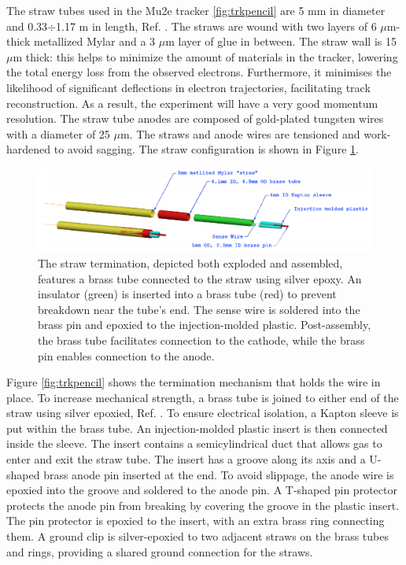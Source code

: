The straw tubes used in the Mu2e tracker \ref{fig:trkpencil} are 5 mm in 
diameter and 0.33$\div$1.17 m in length, 
Ref. \cite{bartoszek2015mu2e}. The straws are wound with two layers of 
6 $\mu$m-thick metallized Mylar and a 3 
$\mu$m layer of glue in between. The straw wall is 15 $\mu$m thick: 
this helps to minimize the amount of materials 
in the tracker, lowering the total energy loss from the observed electrons. 
Furthermore, it minimises the likelihood 
of significant deflections in electron trajectories, 
facilitating track reconstruction. As a result, the experiment 
will have a very good momentum resolution. The straw tube anodes 
are composed of gold-plated tungsten wires 
with a diameter of 25 $\mu$m. The straws and anode wires are tensioned 
and work-hardened to avoid sagging.
The straw configuration is shown in Figure \ref{fig:trktubessmon}.
    \begin{figure}[!h]
        \centering
        \includegraphics[width =\textwidth]{figures/png/Screenshot_20240706_153158.png}
        \caption{The straw termination, depicted both exploded and assembled, 
        features a brass tube connected to the straw using silver epoxy. 
        An insulator (green) is inserted into a brass tube 
        (red) to prevent breakdown near the tube's end. The sense 
        wire is soldered into the brass pin and epoxied to the 
        injection-molded plastic. Post-assembly, the brass tube 
        facilitates connection to the cathode, while the brass pin 
        enables connection to the anode.}
        \label{fig:trktubessmon}
        \end{figure}
Figure \ref{fig:trkpencil} shows the 
termination mechanism that holds the wire in place.
To increase mechanical strength, a brass tube is joined to 
either end of the straw using silver epoxied, Ref. \cite{bartoszek2015mu2e}. 
To ensure electrical isolation, a Kapton sleeve is put within the brass tube. 
An injection-molded plastic insert is then connected 
inside the sleeve. The insert contains a semicylindrical duct that allows 
gas to enter and exit the straw tube. The insert 
has a groove along its axis and a U-shaped brass anode pin inserted at the end. 
To avoid slippage, the anode wire is 
epoxied into the groove and soldered to the anode pin.
A T-shaped pin protector protects the anode pin from breaking by covering 
the groove in the plastic insert. 
The pin protector is epoxied to the insert, with an extra brass ring connecting them. 
A ground clip 
is silver-epoxied to two adjacent straws on the brass tubes and rings, providing a shared 
ground connection for the straws. 

